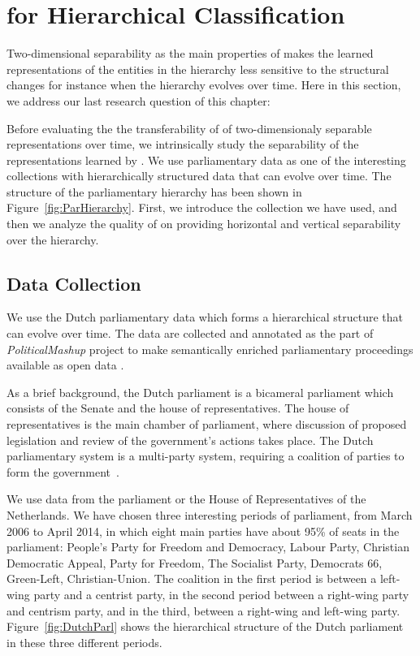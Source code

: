 \section{\achswlm for Hierarchical Classification}
Two\:-\:dimensional separability as the main properties of \achswlm makes the learned representations of the entities in the hierarchy less sensitive to the structural changes for instance when the hierarchy evolves over time. Here in this section, we address our last research question of this chapter:
\begin{resqbox}
\emph{}
\end{resqbox}

Before evaluating the the transferability of of two\:-\:dimensionaly separable representations over time, we intrinsically study the separability of the representations learned by \achswlm. We use parliamentary data as one of the interesting collections with hierarchically structured data that can evolve over time. The structure of the parliamentary hierarchy has been shown in Figure~\ref{fig:ParHierarchy}.  First, we introduce the collection we have used, and then we analyze the quality of \achswlm on providing horizontal and vertical separability over the hierarchy. 

\subsection{Data Collection}
We use the Dutch parliamentary data which forms a hierarchical structure that can evolve over time. The data are collected and annotated as the part of
\emph{Political\-Mashup} project \citep{url:politicalmashup} to make semantically enriched parliamentary proceedings available as open data \citep{marx:2010}.

As a brief background, the Dutch parliament is a bicameral parliament which consists of the Senate and the house of representatives. The house of representatives is the main chamber of parliament, where discussion of proposed legislation and review of the government's actions takes place.  The Dutch parliamentary system is a multi-party system, requiring a coalition of parties to form the government~\citep{deswaan73}.


We use data from the parliament or the House of Representatives of the Netherlands.  We have chosen three interesting periods of parliament, from March 2006 to April 2014, in which eight main parties have about 95\% of seats in the parliament: People's Party for Freedom and Democracy, Labour Party, Christian Democratic Appeal, Party for Freedom, The Socialist Party, Democrats 66, Green-Left, Christian-Union.   The coalition in the first period is between a left-wing party and a centrist party, in the second period between a right-wing party and centrism party, and in the third, between a right-wing and left-wing party. Figure~\ref{fig:DutchParl} shows the hierarchical structure of the Dutch parliament in these three different periods.

